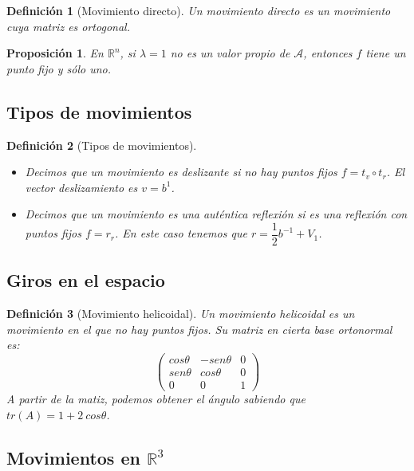 \documentclass[11pt, a4paper]{article}
\newif\IfInSansMode
\newcommand{\R}{\mathbb{R}}
\theoremstyle{theorem-style}
\newtheorem{nprop}{Proposición}[section]
\theoremstyle{definition-style}
\newtheorem{ndef}{Definición}[section]
\theoremstyle{remark-style}
\theoremstyle{example-style}
\begin{document}
\begin{ndef}[Movimiento directo]
  Un movimiento directo es un movimiento cuya matriz es ortogonal. 
\end{ndef}
\begin{nprop}
  En $\R^n$, si $\lambda = 1$ no es un valor propio de $\mathcal A$, entonces $f$ tiene un punto fijo y sólo uno.
\end{nprop}

\subsection{Tipos de movimientos}

\begin{ndef}[Tipos de movimientos]\hfill
  \begin{itemize}
\item Decimos que un movimiento es \textit{deslizante} si no hay puntos fijos $f = t_v \circ t_r$. El vector deslizamiento es $v=b^1$.
\item Decimos que un movimiento es una \textit{auténtica reflexión} si es una reflexión con puntos fijos $f=r_r$. En este caso tenemos que $r= \dfrac{1}{2}b^{-1}+V_1$.
\end{itemize}
\end{ndef}

\subsection{Giros en el espacio}
\begin{ndef}[Movimiento helicoidal]
  Un movimiento helicoidal es un movimiento en el que no hay puntos fijos. Su matriz en cierta base ortonormal es:
  \[
    \begin{pmatrix}
      cos \theta & -sen\theta & 0 \\
      sen \theta & cos\theta & 0\\
      0 & 0 & 1
    \end{pmatrix} 
  \]
  A partir de la matiz, podemos obtener el ángulo sabiendo que $tr(A) = 1+2 \ cos\theta$.
\end{ndef}



\subsection{Movimientos en $\R^3$}
\end{document}
